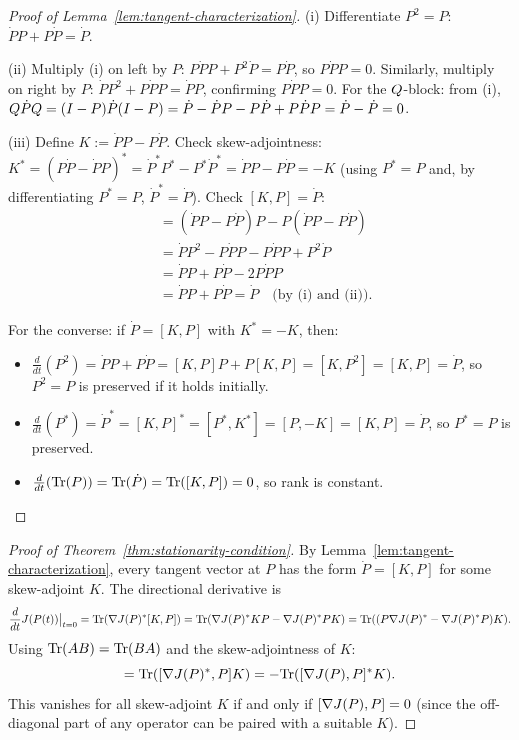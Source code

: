 \begin{proof}[Proof of Lemma~\ref{lem:tangent-characterization}]
\label{proof:lem:tangent-characterization}
(i) Differentiate $P^2 = P$: $\dot{P} P + P \dot{P} = \dot{P}$.

(ii) Multiply (i) on left by $P$: $P \dot{P} P + P^2 \dot{P} = P \dot{P}$, so $P \dot{P} P = 0$.
Similarly, multiply on right by $P$: $\dot{P} P^2 + P \dot{P} P = \dot{P} P$, confirming $P \dot{P} P = 0$.
For the $Q$-block: from (i), $Q \dot{P} Q = (I - P) \dot{P} (I - P) = \dot{P} - \dot{P} P - P \dot{P} + P \dot{P} P = \dot{P} - \dot{P} = 0$.

(iii) Define $K := \dot{P} P - P \dot{P}$.
Check skew-adjointness: $K^* = (P \dot{P} - \dot{P} P)^* = \dot{P}^* P^* - P^* \dot{P}^* = \dot{P} P - P \dot{P} = -K$ (using $P^* = P$ and, by differentiating $P^* = P$, $\dot{P}^* = \dot{P}$).
Check $[K, P] = \dot{P}$:
\begin{align*}
[K, P] &= (\dot{P} P - P \dot{P}) P - P (\dot{P} P - P \dot{P}) \\
&= \dot{P} P^2 - P \dot{P} P - P \dot{P} P + P^2 \dot{P} \\
&= \dot{P} P + P \dot{P} - 2 P \dot{P} P \\
&= \dot{P} P + P \dot{P} = \dot{P} \quad \text{(by (i) and (ii))}.
\end{align*}

For the converse: if $\dot{P} = [K, P]$ with $K^* = -K$, then:
\begin{itemize}
\item $\frac{d}{dt}(P^2) = \dot{P} P + P \dot{P} = [K, P] P + P [K, P] = [K, P^2] = [K, P] = \dot{P}$, so $P^2 = P$ is preserved if it holds initially.
\item $\frac{d}{dt}(P^*) = \dot{P}^* = [K, P]^* = [P^*, K^*] = [P, -K] = [K, P] = \dot{P}$, so $P^* = P$ is preserved.
\item $\frac{d}{dt}(\mathrm{Tr}(P)) = \mathrm{Tr}(\dot{P}) = \mathrm{Tr}([K, P]) = 0$, so rank is constant.
\end{itemize}
\end{proof}

\begin{proof}[Proof of Theorem~\ref{thm:stationarity-condition}]
\label{proof:thm:stationarity-condition}
By Lemma~\ref{lem:tangent-characterization}, every tangent vector at $P$ has the form $\dot{P} = [K, P]$ for some skew-adjoint $K$.
The directional derivative is
\[
\frac{d}{dt} J(P(t)) \big|_{t=0}
= \mathrm{Tr}(\nabla J(P)^* [K, P])
= \mathrm{Tr}(\nabla J(P)^* K P - \nabla J(P)^* P K)
= \mathrm{Tr}((P \nabla J(P)^* - \nabla J(P)^* P) K).
\]
Using $\mathrm{Tr}(AB) = \mathrm{Tr}(BA)$ and the skew-adjointness of $K$:
\[
= \mathrm{Tr}([\nabla J(P)^*, P] K) = -\mathrm{Tr}([\nabla J(P), P]^* K).
\]
This vanishes for all skew-adjoint $K$ if and only if $[\nabla J(P), P] = 0$ (since the off-diagonal part of any operator can be paired with a suitable $K$).
\end{proof}

